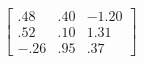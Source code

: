 \documentclass[12pt]{article}
\begin{document}
\pagestyle{empty}
\Large
{}
\pagecolor{ehandbook}

\boldmath
\[
\left[
\begin{array}{ccc}
.48 & .40 & -1.20 \\
.52 & .10 & 1.31 \\
-.26 & .95 & .37
\end{array}
\right]
\]
\end{document}
